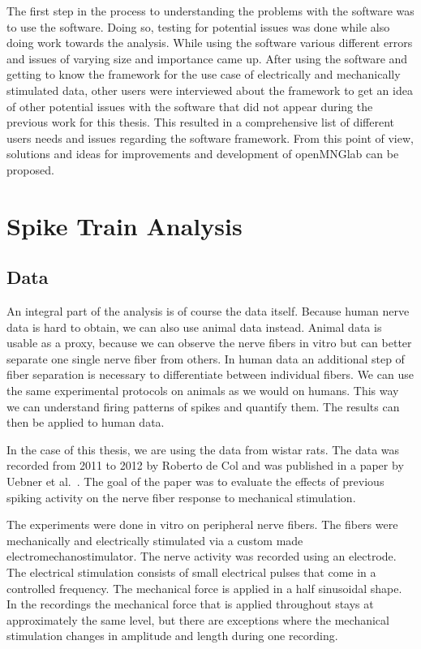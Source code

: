 The first step in the process to understanding the problems with the software was to use the software. Doing so, testing for potential issues was done while also doing work towards the analysis.
While using the software various different errors and issues of varying size and importance came up.
After using the software and getting to know the framework for the use case of electrically and mechanically stimulated data,  other users were interviewed about the framework to get an idea of other potential issues with the software that did not appear during the previous work for this thesis.
This resulted in a comprehensive list of different users needs and issues regarding the software framework. From this point of view, solutions and ideas for improvements and development of openMNGlab can be proposed.


\section{Spike Train Analysis}

\subsection{Data}
An integral part of the analysis is of course the data itself. Because human nerve data is hard to obtain, we can also use animal data instead. Animal data is usable as a proxy, because we can observe the nerve fibers in vitro but can better separate one single nerve fiber from others. In human data an additional step of fiber separation is necessary to differentiate between individual fibers. We can use the same experimental protocols on animals as we would on humans. This way we can understand firing patterns of spikes and quantify them. The results can then be applied to human data.

In the case of this thesis, we are using the data from wistar rats. The data was recorded from 2011 to 2012 by Roberto de Col and was published in a paper by Uebner et al.~\cite{roberto}. The goal of the paper was to evaluate the effects of previous spiking activity on the nerve fiber response to mechanical stimulation.

The experiments were done in vitro on peripheral nerve fibers. The fibers were mechanically and electrically stimulated via a custom made electromechanostimulator. The nerve activity was recorded using an electrode. The electrical stimulation consists of small electrical pulses that come in a controlled frequency. The mechanical force is applied in a half sinusoidal shape. In the recordings the mechanical force that is applied throughout stays at approximately the same level, but there are exceptions where the mechanical stimulation changes in amplitude and length during one recording. 

